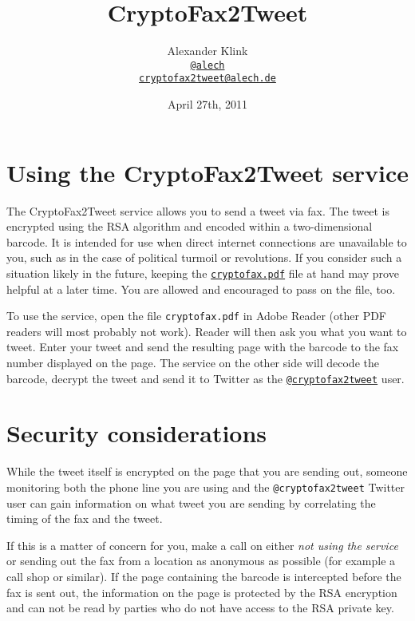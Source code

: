 \documentclass[DIV14,11pt]{scrartcl}
\begin{document}
\title{CryptoFax2Tweet}
\author{Alexander Klink\\\texttt{\href{https://twitter.com/alech}{@alech}}\\\texttt{\href{mailto:cryptofax2tweet@alech.de}{cryptofax2tweet@alech.de}}}
\date{April 27th, 2011}

\maketitle

\thispagestyle{empty}
\section*{Using the CryptoFax2Tweet service}

The CryptoFax2Tweet service allows you to send a tweet via fax.
The tweet is encrypted using the RSA algorithm and encoded within a two-dimensional
	barcode.
It is intended for use when direct internet connections are unavailable to you,
	such as in the case of political turmoil or revolutions.
If you consider such a situation likely in the future, keeping the
\texttt{\href{http://private.chaos-darmstadt.de/~revolution/cryptofax.pdf}{cryptofax.pdf}} file at hand may prove helpful at a later time.
You are allowed and encouraged to pass on the file, too.

To use the service, open the file \texttt{cryptofax.pdf} in Adobe Reader
	(other PDF readers will most probably not work).
Reader will then ask you what you want to tweet.
Enter your tweet and send the resulting page with the barcode to the fax number
	displayed on the page.
The service on the other side will decode the barcode, decrypt the tweet and
send it to Twitter as the \texttt{\href{https://twitter.com/cryptofax2tweet}{@cryptofax2tweet}} user.

\section*{Security considerations}

While the tweet itself is encrypted on the page that you are sending out,
	someone monitoring both the phone line you are using and the
	\texttt{@cryptofax2tweet} Twitter user can gain information on what tweet
	you are sending by correlating the timing of the fax and the tweet.

If this is a matter of concern for you, make a call on either
	\emph{not using the service} or sending out the fax from a location as
	anonymous as possible (for example a call shop or similar).
If the page containing the barcode is intercepted before the fax is sent out,
	the information on the page is protected by the RSA encryption and can not
	be read by parties who do not have access to the RSA private key.
\end{document}
